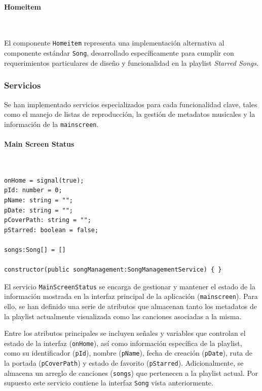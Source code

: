 \documentclass[11pt, a4paper]{article}
\begin{document}
                \paragraph{Homeitem}
                ‎

                El componente \verb|Homeitem| representa una implementación alternativa al componente estándar \verb|Song|, desarrollado específicamente para cumplir con requerimientos particulares de diseño y funcionalidad en la playlist \textit{Starred Songs}.

            \subsubsection{Servicios}

            Se han implementado servicios especializados para cada funcionalidad clave, tales como el manejo de listas de reproducción, la gestión de metadatos musicales y la información de la \verb|mainscreen|.

                \paragraph{Main Screen Status}
                ‎

                \begin{lstlisting}[caption={Atributos Main Screen Status}]
onHome = signal(true);
pId: number = 0;
pName: string = "";
pDate: string = "";
pCoverPath: string = "";
pStarred: boolean = false;

songs:Song[] = []

constructor(public songManagement:SongManagementService) { }
                \end{lstlisting}

                El servicio \verb|MainScreenStatus| se encarga de gestionar y mantener el estado de la información mostrada en la interfaz principal de la aplicación (\verb|mainscreen|). Para ello, se han definido una serie de atributos que almacenan tanto los metadatos de la playlist actualmente visualizada como las canciones asociadas a la misma.

                Entre los atributos principales se incluyen señales y variables que controlan el estado de la interfaz (\verb|onHome|), así como información específica de la playlist, como su identificador (\verb|pId|), nombre (\verb|pName|), fecha de creación (\verb|pDate|), ruta de la portada (\verb|pCoverPath|) y estado de favorito (\verb|pStarred|). Adicionalmente, se almacena un arreglo de canciones (\verb|songs|) que pertenecen a la playlist actual. Por supuesto este servicio contiene la interfaz \verb|Song| vista anteriormente.
\end{document}
